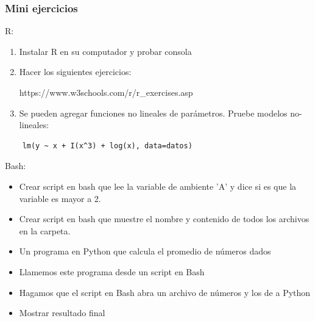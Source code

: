 \documentclass[14pt,aspectratio=169,xcolor=dvipsnames]{beamer}
\begin{document}
\begin{frame}
    \maketitle
\end{frame}
\begin{frame}\frametitle{Mini ejercicios}
    R: 
    \begin{enumerate}
        \item Instalar R en su computador y probar consola
        \item Hacer los siguientes ejercicios: 
            \begin{center}
                https://www.w3schools.com/r/r\_exercises.asp
            \end{center}
        \item Se pueden agregar funciones no lineales de parámetros. Pruebe modelos no-lineales:
    \end{enumerate}

            \begin{verbatim}
    lm(y ~ x + I(x^3) + log(x), data=datos)
            \end{verbatim}

Bash:
    \begin{itemize}
        \item Crear script en bash que lee la variable de ambiente 'A' y dice si es que la variable es mayor a 2.
        \item Crear script en bash que muestre el nombre y contenido de todos los archivos  en la carpeta.
        \item Un programa en Python que calcula el promedio de números dados
        \item Llamemos este programa desde un script en Bash
        \item Hagamos que el script en Bash abra un archivo de números y los de a Python
        \item Mostrar resultado final
    \end{itemize}

\end{frame}
\end{document}
